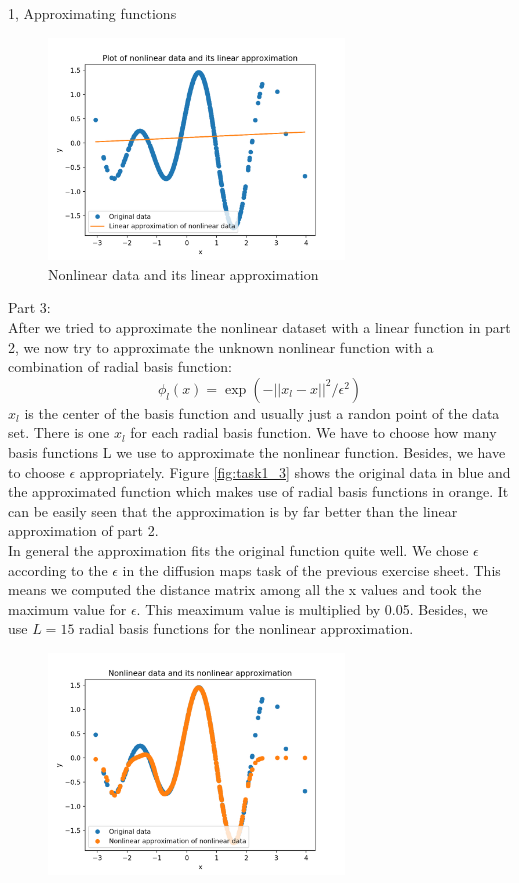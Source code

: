 \documentclass[10pt,a4paper]{article}
\begin{document}
\begin{task}{1, Approximating functions}
\begin{figure}[H]
\centering
\includegraphics[width=0.7\textwidth]{../plots/task1_part2.png}
\caption{Nonlinear data and its linear approximation}
\label{fig:task1_2}
\end{figure}
Part 3: \\
After we tried to approximate the nonlinear dataset with a linear function in part 2, we now try to approximate the unknown nonlinear function with a combination of radial basis function:
\begin{equation*}
	\phi_l(x) = \exp(-||x_l -x||^2/\epsilon^2)
\end{equation*}
$x_l$ is the center of the basis function and usually just a randon point of the data set. There is one $x_l$ for each radial basis function. We have to choose how many basis functions L  we use to approximate the nonlinear function. Besides, we have to choose $\epsilon$ appropriately.
Figure \ref{fig:task1_3} shows the original data in blue and the approximated function which makes use of radial basis functions in orange. It can be easily seen that the approximation is by far better than the linear approximation of part 2. \\ In general the approximation fits the original function quite well.
We chose $\epsilon$ according to the $\epsilon$ in the diffusion maps task of the previous exercise sheet. This means we computed the distance matrix among all the x values and took the maximum value for $\epsilon$. This meaximum value is multiplied by 0.05. Besides, we use $L=15$ radial basis functions for the nonlinear approximation.
\begin{figure}[H]
\centering
\includegraphics[width=0.7\textwidth]{../plots/task1_part3_eps.png}

\end{figure}
\end{task}
\end{document}
